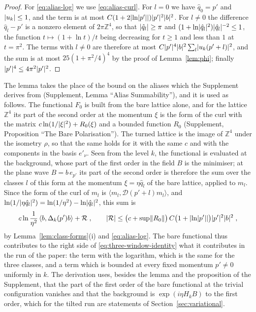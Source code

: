 \documentclass[11pt]{preprint}
\DeclarePairedDelimiter{\abs}{\lvert}{\rvert}
\DeclarePairedDelimiter{\norm}{\lVert}{\rVert}
\numberwithin{equation}{section}
\theoremstyle{definition}
\theoremstyle{remark}
\theoremstyle{plain}
\begin{document}
\begin{proof}
For \eqref{eq:alias-log} we use \eqref{eq:alias-curl}. For $l = 0$ we have $\hat q_0 = p'$ and $\abs{u_k} \leq 1$, and the term is at most $C(1 + 2\abs{\ln\abs{p'}})\abs{p'}^2\abs b^2$. For $l \neq 0$ the difference $\hat q_l - p'$ is a nonzero element of $2\pi\mathbb Z^4$, so that $\abs{\hat q_l} \geq \pi$ and $(1 + \ln\abs{\hat q_l}^2)\abs{\hat q_l}^{-2} \leq 1$, the function $t \mapsto (1 + \ln t)/t$ being decreasing for $t \geq 1$ and less than $1$ at $t = \pi^2$. The terms with $l \neq 0$ are therefore at most $C\abs{p'}^4\abs b^2\sum_l\abs{u_k(p' + l)}^2$, and the sum is at most $25(1 + \pi^2/4)^4$ by the proof of Lemma~\ref{lem:phi}; finally $\abs{p'}^4 \leq 4\pi^2\abs{p'}^2$.
\end{proof}

The lemma takes the place of the bound on the aliases which the Supplement derives from \cite[(1.63), p.~28]{BalabanPRT1} (Supplement, Lemma ``Alias Summability''), and it is used as follows. The functional $F_0$ is built from the bare lattice alone, and for the lattice $\mathbb Z^4$ its part of the second order at the momentum $\xi$ is the form of the curl with the matrix $c\ln(1/\abs\xi^2) + R_0(\xi)$ and a bounded function $R_0$ (Supplement, Proposition ``The Bare Polarisation''). The turned lattice is the image of $\mathbb Z^4$ under the isometry $\rho$, so that the same holds for it with the same $c$ and with the components in the basis $e'_\nu$. Seen from the level $k$, the functional is evaluated at the background, whose part of the first order in the field $B$ is the minimiser; at the plane wave $B = b\,e_{p'}$ its part of the second order is therefore the sum over the classes $l$ of this form at the momentum $\xi = \eta\hat q_l$ of the bare lattice, applied to $m_l$. Since the form of the curl of $m_l$ is $\langle m_l, \mathcal D(p' + l)m_l\rangle$, and $\ln(1/\abs{\eta\hat q_l}^2) = \ln(1/\eta^2) - \ln\abs{\hat q_l}^2$, this sum is
\begin{equation}\label{eq:bare-from-level}
    c\ln\frac{1}{\eta^2}\,\langle b, \Delta_k(p')b\rangle + \mathcal R\;,
    \qquad
    \abs{\mathcal R} \leq \bigl(c + \sup\norm{R_0}\bigr)\,C\bigl(1 + \abs{\ln\abs{p'}}\bigr)\abs{p'}^2\abs b^2\;,
\end{equation}
by Lemma~\ref{lem:class-forms}(i) and \eqref{eq:alias-log}. The bare functional thus contributes to the right side of \eqref{eq:three-window-identity} what it contributes in the run of the paper: the term with the logarithm, which is the same for the three classes, and a term which is bounded at every fixed momentum $p' \neq 0$ uniformly in $k$. The derivation uses, besides the lemma and the proposition of the Supplement, that the part of the first order of the bare functional at the trivial configuration vanishes and that the background is $\exp(i\eta H_kB)$ to the first order, which for the tilted run are statements of Section~\ref{sec:variational}.
\end{document}
